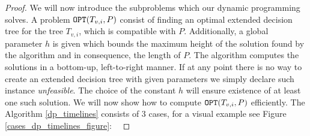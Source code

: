 \begin{theorem}
\begin{proof}
We will now introduce the subproblems which our dynamic programming solves. A problem $\texttt{OPT}\mathopen{}\left( T_{v,i}, P \right)$ consist of finding an optimal extended decision tree for the tree $T_{v,i}$, which is compatible with $P$. Additionally, a global parameter $h$ is given which bounds the maximum height of the solution found by the algorithm and in consequence, the length of $P$. The algorithm computes the solutions in a bottom-up, left-to-right manner. If at any point there is no way to create an extended decision tree with given parameters we simply declare such instance \textit{unfeasible}. The choice of the constant $h$ will ensure existence of at least one such solution. We will now show how to compute $\texttt{OPT}\mathopen{}\left( T_{v,i}, P \right)$ efficiently. The Algorithm \ref{dp_timelines} consists of 3 cases, for a visual example see Figure \ref{cases_dp_timelines_figure}:
\




\end{proof}
\end{theorem}
